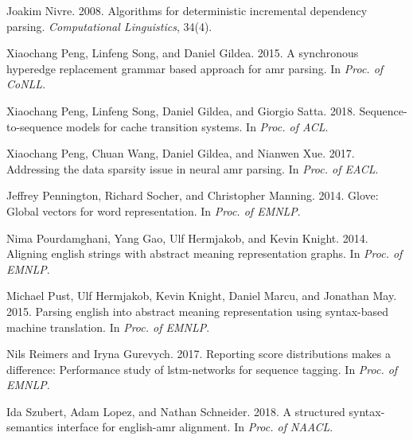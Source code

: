\documentclass[11pt,a4paper]{article}
\begin{document}
\begin{thebibliography}{30}
	Joakim Nivre. 2008.
	\newblock Algorithms for deterministic incremental dependency parsing.
	\newblock \emph{Computational Linguistics}, 34(4).
	
	Xiaochang Peng, Linfeng Song, and Daniel Gildea. 2015.
	\newblock A synchronous hyperedge replacement grammar based approach for amr
	parsing.
	\newblock In \emph{Proc. of CoNLL}.
	
	Xiaochang Peng, Linfeng Song, Daniel Gildea, and Giorgio Satta. 2018.
	\newblock Sequence-to-sequence models for cache transition systems.
	\newblock In \emph{Proc. of ACL}.
	
	Xiaochang Peng, Chuan Wang, Daniel Gildea, and Nianwen Xue. 2017.
	\newblock Addressing the data sparsity issue in neural amr parsing.
	\newblock In \emph{Proc. of EACL}.
	
	Jeffrey Pennington, Richard Socher, and Christopher Manning. 2014.
	\newblock Glove: Global vectors for word representation.
	\newblock In \emph{Proc. of EMNLP}.
	
	Nima Pourdamghani, Yang Gao, Ulf Hermjakob, and Kevin Knight. 2014.
	\newblock Aligning english strings with abstract meaning representation graphs.
	\newblock In \emph{Proc. of EMNLP}.
	
	Michael Pust, Ulf Hermjakob, Kevin Knight, Daniel Marcu, and Jonathan May.
	2015.
	\newblock Parsing english into abstract meaning representation using
	syntax-based machine translation.
	\newblock In \emph{Proc. of EMNLP}.
	
	Nils Reimers and Iryna Gurevych. 2017.
	\newblock Reporting score distributions makes a difference: Performance study
	of lstm-networks for sequence tagging.
	\newblock In \emph{Proc. of EMNLP}.
	
	Ida Szubert, Adam Lopez, and Nathan Schneider. 2018.
	\newblock A structured syntax-semantics interface for english-amr alignment.
	\newblock In \emph{Proc. of NAACL}.
	

\end{thebibliography}
\end{document}
